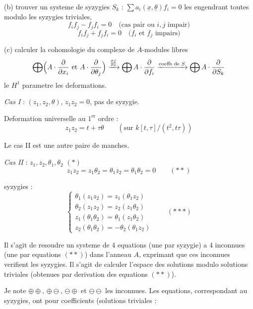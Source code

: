 \documentclass[11pt,a4paper]{article}
\theoremstyle{plain}
\theoremstyle{definition}
\begin{document}
(b) trouver un systeme de syzygies $S_k$ : $\sum a_i(\underline{x},\underline{\theta}) f_i = 0$ les engendrant toutes modulo les syzygies triviales,
\[
f_i f_j - f_j f_i = 0 \quad \text{(cas pair ou $i,j$ impair)}
\]
\[
f_i f_j + f_j f_i = 0 \quad \text{($f_i$ et $f_j$ impairs)}
\]

(c) calculer la cohomologie du complexe de $A$-modules libres
\[
\bigoplus \Bigl(A \cdot \frac{\partial}{\partial x_i} \text{ et } A \cdot \frac{\partial}{\partial \theta_j}\Bigr) \xrightarrow{\frac{\partial f}{\partial x}} \bigoplus A \cdot \frac{\partial}{\partial f_i} \xrightarrow{\text{coeffs de } S} \bigoplus A \cdot \frac{\partial}{\partial S_k}
\]
le $H^1$ parametre les deformations.

\medskip

\noindent \textit{Cas I} : $(z_1, z_2, \theta)$, $z_1 z_2 = 0$, pas de syzygie.

Deformation universelle au $1^{\text{er}}$ ordre :
\[
z_1 z_2 = t + \tau \theta \qquad (\text{sur } k[t,\tau]/(t^2, t\tau))
\]

Le cas II est une autre paire de manches.

\newpage

\noindent \textit{Cas II} : $z_1, z_2, \theta_1, \theta_2$ \hfill $(*)$
\[
z_1 z_2 = z_1 \theta_2 = \theta_1 z_2 = \theta_1 \theta_2 = 0 \qquad (**)
\]

syzygies :
\[
\begin{cases}
\theta_1(z_1 z_2) = z_1(\theta_1 z_2) \\
\theta_2(z_1 z_2) = z_2(z_1 \theta_2) \\
z_1(\theta_1 \theta_2) = \theta_1(z_1 \theta_2) \\
z_2(\theta_1 \theta_2) = -\theta_2(\theta_1 z_2)
\end{cases} \qquad (***)
\]

Il s'agit de resoudre un systeme de 4 equations (une par syzygie) a 4 inconnues (une par equations $(**)$) dans l'anneau $A$, exprimant que ces inconnues verifient les syzygies. Il s'agit de calculer l'espace des solutions modulo solutions triviales (obtenues par derivation des equations $(**)$).

Je note $\oplus\oplus$, $\oplus\ominus$, $\ominus\oplus$ et $\ominus\ominus$ les inconnues. Les equations, correspondant au syzygies, ont pour coefficients (solutions triviales :
\end{document}
